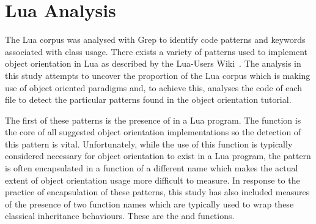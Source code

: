 \section{Lua Analysis}
The Lua corpus was analysed with Grep to identify code patterns and keywords associated with class usage. There exists a variety of patterns used to implement object orientation in Lua as described by the Lua-Users Wiki~\cite{LuaObjectOrientation}. The analysis in this study attempts to uncover the proportion of the Lua corpus which is making use of object oriented paradigms and, to achieve this, analyses the code of each file to detect the particular patterns found in the object orientation tutorial.
\newline

The first of these patterns is the presence of  in a Lua program. The  function is the core of all suggested object orientation implementations so the detection of this pattern is vital. Unfortunately, while the use of this function is typically considered necessary for object orientation to exist in a Lua program, the pattern is often encapsulated in a function of a different name which makes the actual extent of object orientation usage more difficult to measure. In response to the practice of encapsulation of these patterns, this study has also included measures of the presence of two function names which are typically used to wrap these classical inheritance behaviours. These are the  and  functions.






